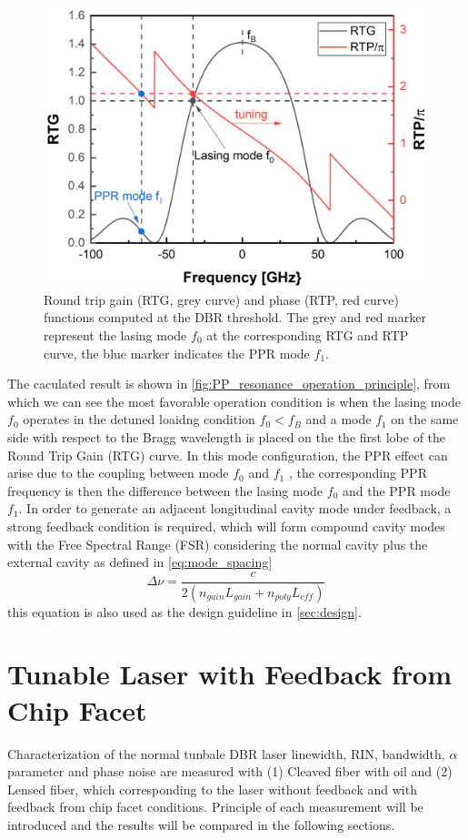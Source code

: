 \begin{figure}[ht]
    \centering
    \includegraphics[width=.7\linewidth]{figures/PP_resonance_operation_principle_2.png}
    \caption{Round trip gain (RTG, grey curve) and phase (RTP, red curve) functions computed at the DBR threshold. The grey and red marker represent the lasing mode $f_0$ at the corresponding RTG and RTP curve, the blue marker indicates the PPR mode $f_1$.}
    \label{fig:PP_resonance_operation_principle}
\end{figure}

The caculated result is shown in \autoref{fig:PP_resonance_operation_principle}, from which we can see the most favorable operation condition is when the lasing mode $f_0$ operates in the detuned loaidng condition $f_0<f_B$ and a mode $f_1$ on the same side with respect to the Bragg wavelength is placed on the the first lobe of the Round Trip Gain (RTG) curve. In this mode configuration, the PPR effect can arise due to the coupling between mode $f_0$ and $f_1$ \cite{montrosset2014laser}, the corresponding PPR frequency is then the difference between the lasing mode $f_0$ and the PPR mode $f_1$. In order to generate an adjacent longitudinal cavity mode under feedback, a strong feedback condition is required, which will form compound cavity modes with the Free Spectral Range (FSR) considering the normal cavity plus the external cavity as defined in \autoref{eq:mode_spacing}
\begin{equation}
    \Delta\nu=\frac{c}{2(n_{gain}L_{gain}+n_{poly}L_{eff})}
    \label{eq:mode_spacing}
\end{equation}
this equation is also used as the design guideline in \autoref{sec:design}.

\chapter{Tunable Laser with Feedback from Chip Facet}\label{ch:Normal_laser}
Characterization of the normal tunbale DBR laser linewidth, RIN, bandwidth, $\alpha$ parameter and phase noise are measured with (1) Cleaved fiber with oil and (2) Lensed fiber, which corresponding to the laser without feedback and with feedback from chip facet conditions. Principle of each measurement will be introduced and the results will be compared in the following sections.

